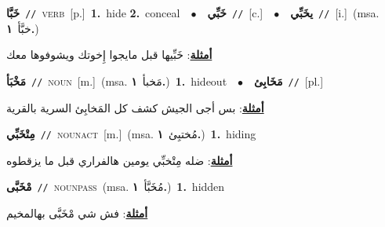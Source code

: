 \documentclass[10pt,a4paper,twoside]{article} %
\begin{document}
\begin{multicols}{2}
{\setlength\topsep{0pt}\textbf{\foreignlanguage{arabic}{خَبَّا}}\ {\color{gray}\texttt{//}\color{black}}\ \textsc{verb}\ [p.]\ \textbf{1.}~hide  \textbf{2.}~conceal\ \ $\bullet$\ \ \setlength\topsep{0pt}\textbf{\foreignlanguage{arabic}{خَبِّي}}\ {\color{gray}\texttt{//}\color{black}}\ [c.]\ \ $\bullet$\ \ \setlength\topsep{0pt}\textbf{\foreignlanguage{arabic}{يخَبِّي}}\ {\color{gray}\texttt{//}\color{black}}\ [i.]\ \color{gray}(msa. \foreignlanguage{arabic}{خبَّأ}~\foreignlanguage{arabic}{\textbf{١.}})\color{black}\  \begin{flushright}\color{gray}\foreignlanguage{arabic}{\textbf{\underline{\foreignlanguage{arabic}{أمثلة}}}: خَبِّيها قبل مايجوا إِخوتك ويشوفوها معك}\end{flushright}\color{black}} \vspace{2mm}

{\setlength\topsep{0pt}\textbf{\foreignlanguage{arabic}{مَخْبَأ}}\ {\color{gray}\texttt{//}\color{black}}\ \textsc{noun}\ [m.]\ \color{gray}(msa. \foreignlanguage{arabic}{مَخبأ}~\foreignlanguage{arabic}{\textbf{١.}})\color{black}\ \textbf{1.}~hideout\ \ $\bullet$\ \ \setlength\topsep{0pt}\textbf{\foreignlanguage{arabic}{مَخَابِئ}}\ {\color{gray}\texttt{//}\color{black}}\ [pl.]\  \begin{flushright}\color{gray}\foreignlanguage{arabic}{\textbf{\underline{\foreignlanguage{arabic}{أمثلة}}}: بس أجى الجيش كشف كل المَخابِئ السرية بالقرية}\end{flushright}\color{black}} \vspace{2mm}

{\setlength\topsep{0pt}\textbf{\foreignlanguage{arabic}{مِتْخَبِّي}}\ {\color{gray}\texttt{//}\color{black}}\ \textsc{noun\textunderscore act}\ [m.]\ \color{gray}(msa. \foreignlanguage{arabic}{مُختبِئ}~\foreignlanguage{arabic}{\textbf{١.}})\color{black}\ \textbf{1.}~hiding\  \begin{flushright}\color{gray}\foreignlanguage{arabic}{\textbf{\underline{\foreignlanguage{arabic}{أمثلة}}}: ضله مِتْخبِّي يومين هالفراري قبل ما يزقطوه}\end{flushright}\color{black}} \vspace{2mm}

{\setlength\topsep{0pt}\textbf{\foreignlanguage{arabic}{مْخَبَّى}}\ {\color{gray}\texttt{//}\color{black}}\ \textsc{noun\textunderscore pass}\ \color{gray}(msa. \foreignlanguage{arabic}{مُخَبَّأ}~\foreignlanguage{arabic}{\textbf{١.}})\color{black}\ \textbf{1.}~hidden\  \begin{flushright}\color{gray}\foreignlanguage{arabic}{\textbf{\underline{\foreignlanguage{arabic}{أمثلة}}}: فش شي مْخَبَّى بهالمخيم}\end{flushright}\color{black}} \vspace{2mm}


\end{multicols}
\end{document}
